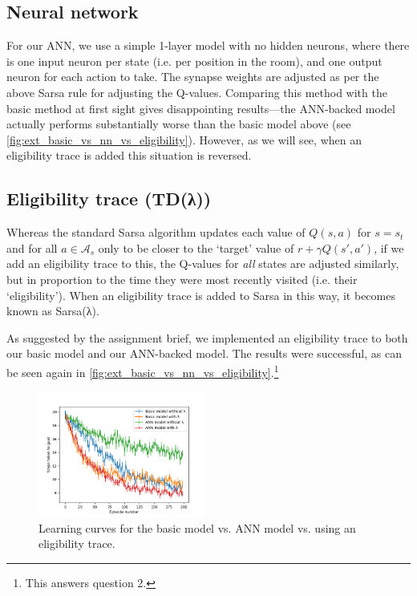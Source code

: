 \documentclass[a4paper, 11pt, twocolumn, final]{article} %
\begin{document}
\subsection{Neural network} \label{sec:ext_nn} For our ANN, we use a simple
1-layer model with no hidden neurons, where there is one input neuron per state
(i.e. per position in the room), and one output neuron for each action to take.
The synapse weights are adjusted as per the above Sarsa rule for adjusting the
Q-values.  Comparing this method with the basic method at first sight gives
disappointing results---the ANN-backed model actually performs substantially
worse than the basic model above (see
\autoref{fig:ext_basic_vs_nn_vs_eligibility}).  However, as we will see, when an
eligibility trace is added this situation is reversed.

\subsection{Eligibility trace (TD(λ))} Whereas the standard Sarsa algorithm
updates each value of $Q(s, a)$ for $s = s_t$ and for all $a \in \mathcal{A}_s$
only to be closer to the `target' value of $r + \gamma Q(s', a')$, if we add an
eligibility trace to this, the Q-values for \textit{all} states are adjusted
similarly, but in proportion to the time they were most recently visited (i.e.
their `eligibility').  When an eligibility trace is added to Sarsa in this way,
it becomes known as Sarsa(λ).

As suggested by the assignment brief, we implemented an eligibility trace to
both our basic model and our ANN-backed model.  The results were successful, as
can be seen again in \autoref{fig:ext_basic_vs_nn_vs_eligibility}.\footnote{This
answers question 2.}

\begin{figure}
  \includegraphics[width=0.49\textwidth]{figures/basic_vs_nn_vs_eligibility.png}
  \caption{Learning curves for the basic model vs. ANN model vs. using an
  eligibility trace.}
  \label{fig:ext_basic_vs_nn_vs_eligibility}
\end{figure}
\end{document}
